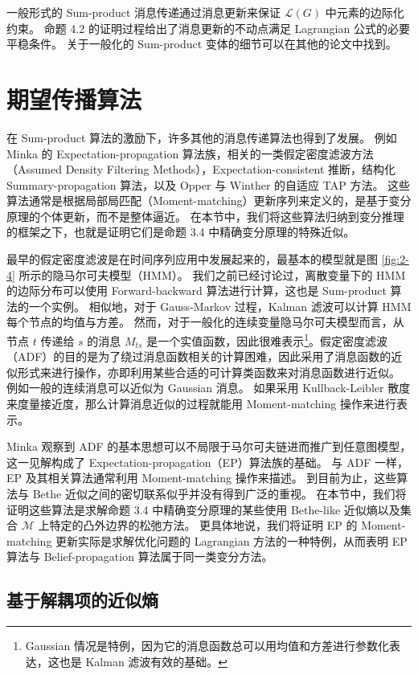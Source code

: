一般形式的 Sum-product 消息传递通过消息更新来保证 $\mathcal{L}(G)$ 中元素的边际化约束。
命题 4.2 的证明过程给出了消息更新的不动点满足 Lagrangian 公式的必要平稳条件。
关于一般化的 Sum-product 变体的细节可以在其他的论文中找到。

\section{期望传播算法}

在 Sum-product 算法的激励下，许多其他的消息传递算法也得到了发展。
例如 Minka 的 Expectation-propagation 算法族，相关的一类假定密度滤波方法（Assumed Density Filtering Methods），Expectation-consistent 推断，结构化 Summary-propagation 算法，以及 Opper 与 Winther 的自适应 TAP 方法。
这些算法通常是根据局部局匹配（Moment-matching）更新序列来定义的，是基于变分原理的个体更新，而不是整体逼近。
在本节中，我们将这些算法归纳到变分推理的框架之下，也就是证明它们是命题 3.4 中精确变分原理的特殊近似。

最早的假定密度滤波是在时间序列应用中发展起来的，最基本的模型就是图 \ref{fig:2-4} 所示的隐马尔可夫模型（HMM）。
我们之前已经讨论过，离散变量下的 HMM 的边际分布可以使用 Forward-backward 算法进行计算，这也是 Sum-product 算法的一个实例。
相似地，对于 Gauss-Markov 过程，Kalman 滤波可以计算 HMM 每个节点的均值与方差。
然而，对于一般化的连续变量隐马尔可夫模型而言，从节点 $t$ 传递给 $s$ 的消息 $M_{ts}$ 是一个实值函数，因此很难表示\footnote{
    Gaussian 情况是特例，因为它的消息函数总可以用均值和方差进行参数化表达，这也是 Kalman 滤波有效的基础。
}。假定密度滤波（ADF）的目的是为了绕过消息函数相关的计算困难，因此采用了消息函数的近似形式来进行操作，亦即利用某些合适的可计算类函数来对消息函数进行近似。
例如一般的连续消息可以近似为 Gaussian 消息。
如果采用 Kullback-Leibler 散度来度量接近度，那么计算消息近似的过程就能用 Moment-matching 操作来进行表示。

Minka 观察到 ADF 的基本思想可以不局限于马尔可夫链进而推广到任意图模型，这一见解构成了 Expectation-propagation（EP）算法族的基础。
与 ADF 一样，EP 及其相关算法通常利用 Moment-matching 操作来描述。
到目前为止，这些算法与 Bethe 近似之间的密切联系似乎并没有得到广泛的重视。
在本节中，我们将证明这些算法是求解命题 3.4 中精确变分原理的某些使用 Bethe-like 近似熵以及集合 $\mathcal{M}$ 上特定的凸外边界的松弛方法。
更具体地说，我们将证明 EP 的 Moment-matching 更新实际是求解优化问题的 Lagrangian 方法的一种特例，从而表明 EP 算法与 Belief-propagation 算法属于同一类变分方法。

\subsection{基于解耦项的近似熵}

